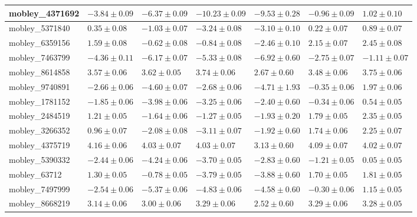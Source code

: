 \documentclass{article}
\begin{document}
\begin{landscape}
\begin{longtable}{|l{3.0cm}|l{3.0cm}|l{3.2cm}|l{3.6cm}|l{3.0cm}|l{3.0cm}|l{3.0cm}|}
mobley\_4371692	&	$	-3.84	\pm	0.09	$	&	$	-6.37	\pm	0.09	$	&	$	-10.23	\pm	0.09	$	&	$	-9.53	\pm	0.28	$	&	$	-0.96	\pm	0.09	$	&	$	1.02	\pm	0.10	$	\\ \hline
mobley\_5371840	&	$	0.35	\pm	0.08	$	&	$	-1.03	\pm	0.07	$	&	$	-3.24	\pm	0.08	$	&	$	-3.10	\pm	0.10	$	&	$	0.22	\pm	0.07	$	&	$	0.89	\pm	0.07	$	\\ \hline
mobley\_6359156	&	$	1.59	\pm	0.08	$	&	$	-0.62	\pm	0.08	$	&	$	-0.84	\pm	0.08	$	&	$	-2.46	\pm	0.10	$	&	$	2.15	\pm	0.07	$	&	$	2.45	\pm	0.08	$	\\ \hline
mobley\_7463799	&	$	-4.36	\pm	0.11	$	&	$	-6.17	\pm	0.07	$	&	$	-5.33	\pm	0.08	$	&	$	-6.92	\pm	0.60	$	&	$	-2.75	\pm	0.07	$	&	$	-1.11	\pm	0.07	$	\\ \hline
mobley\_8614858	&	$	3.57	\pm	0.06	$	&	$	3.62	\pm	0.05	$	&	$	3.74	\pm	0.06	$	&	$	2.67	\pm	0.60	$	&	$	3.48	\pm	0.06	$	&	$	3.75	\pm	0.06	$	\\ \hline
mobley\_9740891	&	$	-2.66	\pm	0.06	$	&	$	-4.60	\pm	0.07	$	&	$	-2.68	\pm	0.06	$	&	$	-4.71	\pm	1.93	$	&	$	-0.35	\pm	0.06	$	&	$	1.97	\pm	0.06	$	\\ \hline
mobley\_1781152	&	$	-1.85	\pm	0.06	$	&	$	-3.98	\pm	0.06	$	&	$	-3.25	\pm	0.06	$	&	$	-2.40	\pm	0.60	$	&	$	-0.34	\pm	0.06	$	&	$	0.54	\pm	0.05	$	\\ \hline
mobley\_2484519	&	$	1.21	\pm	0.05	$	&	$	-1.64	\pm	0.06	$	&	$	-1.27	\pm	0.05	$	&	$	-1.93	\pm	0.20	$	&	$	1.79	\pm	0.05	$	&	$	2.35	\pm	0.05	$	\\ \hline
mobley\_3266352	&	$	0.96	\pm	0.07	$	&	$	-2.08	\pm	0.08	$	&	$	-3.11	\pm	0.07	$	&	$	-1.92	\pm	0.60	$	&	$	1.74	\pm	0.06	$	&	$	2.25	\pm	0.07	$	\\ \hline
mobley\_4375719	&	$	4.16	\pm	0.06	$	&	$	4.03	\pm	0.07	$	&	$	4.03	\pm	0.07	$	&	$	3.13	\pm	0.60	$	&	$	4.09	\pm	0.07	$	&	$	4.02	\pm	0.07	$	\\ \hline
mobley\_5390332	&	$	-2.44	\pm	0.06	$	&	$	-4.24	\pm	0.06	$	&	$	-3.70	\pm	0.05	$	&	$	-2.83	\pm	0.60	$	&	$	-1.21	\pm	0.05	$	&	$	0.05	\pm	0.05	$	\\ \hline
mobley\_63712	&	$	1.30	\pm	0.05	$	&	$	-0.78	\pm	0.05	$	&	$	-3.79	\pm	0.05	$	&	$	-3.88	\pm	0.60	$	&	$	1.70	\pm	0.05	$	&	$	1.81	\pm	0.05	$	\\ \hline
mobley\_7497999	&	$	-2.54	\pm	0.06	$	&	$	-5.37	\pm	0.06	$	&	$	-4.83	\pm	0.06	$	&	$	-4.58	\pm	0.60	$	&	$	-0.30	\pm	0.06	$	&	$	1.15	\pm	0.05	$	\\ \hline
mobley\_8668219	&	$	3.14	\pm	0.06	$	&	$	3.00	\pm	0.06	$	&	$	3.29	\pm	0.06	$	&	$	2.52	\pm	0.60	$	&	$	3.29	\pm	0.06	$	&	$	3.28	\pm	0.05	$	\\ \hline

\end{longtable}
\end{landscape}
\end{document}
